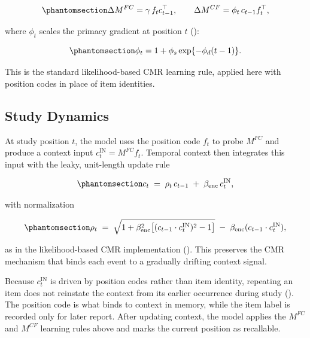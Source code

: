 \documentclass[
  man,
  floatsintext,
  longtable,
  nolmodern,
  notxfonts,
  notimes,
  draftfirst,
  colorlinks=true,linkcolor=blue,citecolor=blue,urlcolor=blue]{apa7}
\begin{document}
\begin{equation}\phantomsection\label{eq-3}{
\Delta M^{FC} = \gamma\,f_t c_{t-1}^{\top}, \qquad
\Delta M^{CF} = \phi_t\,c_{t-1} f_t^{\top},
}\end{equation}

where \(\phi_t\) scales the primacy gradient at position \(t\)
():

\begin{equation}\phantomsection\label{eq-4}{
\phi_t = 1 + \phi_s \exp\{-\phi_d (t-1)\}.
}\end{equation}

This is the standard likelihood-based CMR learning rule, applied here
with position codes in place of item identities.

\subsection{Study Dynamics}\label{study-dynamics}

At study position \(t\), the model uses the position code \(f_t\) to
probe \(M^{FC}\) and produce a context input
\(c^{\text{IN}}_t = M^{FC} f_t\). Temporal context then integrates this
input with the leaky, unit-length update rule

\begin{equation}\phantomsection\label{eq-5}{
c_t \;=\; \rho_t\,c_{t-1} \;+\; \beta_{\text{enc}}\,c^{\text{IN}}_t,
}\end{equation}

with normalization

\begin{equation}\phantomsection\label{eq-6}{
\rho_t \;=\; \sqrt{1 + \beta_{\text{enc}}^2\bigl[(c_{t-1}\cdot c^{\text{IN}}_t)^2 - 1\bigr]}\;-\;\beta_{\text{enc}}(c_{t-1}\cdot c^{\text{IN}}_t),
}\end{equation}

as in the likelihood-based CMR implementation
(). This
preserves the CMR mechanism that binds each event to a gradually
drifting context signal.

Because \(c^{\text{IN}}_t\) is driven by position codes rather than item
identity, repeating an item does not reinstate the context from its
earlier occurrence during study
(). The
position code is what binds to context in memory, while the item label
is recorded only for later report. After updating context, the model
applies the \(M^{FC}\) and \(M^{CF}\) learning rules above and marks the
current position as recallable.
\end{document}
